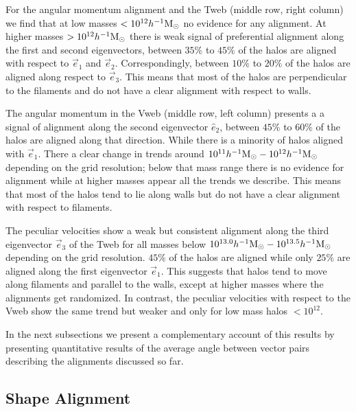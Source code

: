 \documentclass[useAMS,usenatbib]{mn2e}
\newcommand{\hMsun}{{\ifmmode{h^{-1}{\rm
        {M_{\odot}}}}\else{$h^{-1}{\rm{M_{\odot}}}$~}\fi}}
\begin{document}
For the angular momentum alignment and the Tweb (middle row, right
column) we find that at low masses $<10^{12}\hMsun$ no evidence for
any alignment. At higher masses $>10^{12}\hMsun$ there is weak signal
of preferential alignment along the first and second eigenvectors,
between $35\%$ to $45\%$ of the halos are aligned with respect to
$\vec{e}_1$ and $\vec{e}_2$. Correspondingly, between $10\%$ to $20\%$
of the halos are aligned along respect to $\vec{e}_{3}$. This means
that most of the halos are perpendicular to the filaments and do not
have a clear alignment with respect to walls.

The angular momentum in the Vweb (middle row, left column) presents a
a signal of alignment along the second eigenvector $\hat{e}_{2}$,
between $45\%$ to $60\%$ of the halos are aligned along that
direction. While there is a minority of halos aligned with
$\vec{e}_{1}$.  There a clear change in trends around
$10^{11}\hMsun-10^{12}\hMsun$ depending on the grid resolution;
below that mass range there is no evidence for alignment while at
higher masses appear all the trends we describe. This means that most
of the halos tend to lie along walls but do not have a clear alignment
with respect to filaments.

The peculiar velocities show a weak but consistent alignment along the
third eigenvector $\vec{e}_{3}$ of the Tweb for all masses below
$10^{13.0}\hMsun-10^{13.5}\hMsun$ depending on the grid
resolution. $45\%$ of the halos are aligned while only $25\%$ are
aligned along the first eigenvector $\vec{e}_1$. This suggests that
halos tend to move along filaments and parallel to the walls, except
at higher masses where the alignments get randomized.  In contrast,
the peculiar velocities with respect to the Vweb show the same trend
but weaker and only for low mass halos $<10^{12}$.


In the next subsections we present a complementary account of this
results by presenting quantitative results of the average angle
between vector pairs describing the alignments discussed so far.


\subsection{Shape Alignment}
\end{document}
